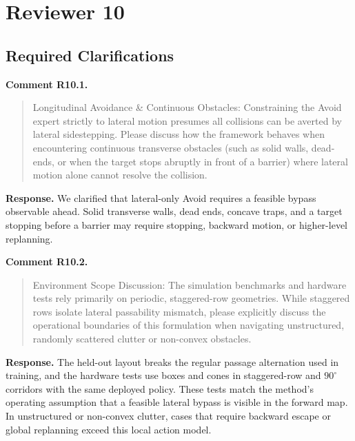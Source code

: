 \documentclass[letterpaper,11pt]{article}
\begin{document}
\section*{Reviewer 10}
\subsection*{Required Clarifications}
\noindent\textbf{Comment R10.1.}
\begin{quote}\color{reviewgray}
Longitudinal Avoidance \& Continuous Obstacles: Constraining the Avoid expert strictly to lateral motion presumes all collisions can be averted by lateral sidestepping. Please discuss how the framework behaves when encountering continuous transverse obstacles (such as solid walls, dead-ends, or when the target stops abruptly in front of a barrier) where lateral motion alone cannot resolve the collision.
\end{quote}
\noindent\textbf{Response.}
We clarified that lateral-only Avoid requires a feasible bypass observable ahead. Solid transverse walls, dead ends, concave traps, and a target stopping before a barrier may require stopping, backward motion, or higher-level replanning. 
\par\nopagebreak[4]


\noindent\textbf{Comment R10.2.}
\begin{quote}\color{reviewgray}
Environment Scope Discussion: The simulation benchmarks and hardware tests rely primarily on periodic, staggered-row geometries. While staggered rows isolate lateral passability mismatch, please explicitly discuss the operational boundaries of this formulation when navigating unstructured, randomly scattered clutter or non-convex obstacles.
\end{quote}
\noindent\textbf{Response.}
The held-out layout breaks the regular passage alternation used in training, and the hardware tests use boxes and cones in staggered-row and $90^\circ$ corridors with the same deployed policy. These tests match the method's operating assumption that a feasible lateral bypass is visible in the forward map. In unstructured or non-convex clutter, cases that require backward escape or global replanning exceed this local action model.
\par\nopagebreak[4]
\end{document}
